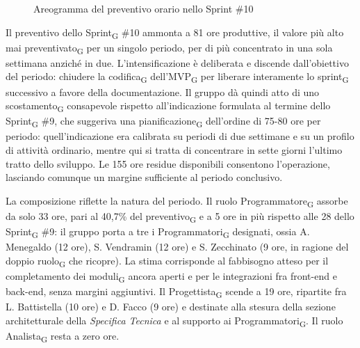 ﻿\documentclass[a4paper, 10pt, colorlinks=true, linkcolor=black, urlcolor=blue, citecolor=blue, hidelinks]{article}
\begin{document}
\begin{figure}[H]

\caption{Areogramma del preventivo orario nello Sprint \#10}
\label{fig:preventivo-sprint10}
\end{figure}

Il preventivo dello Sprint\textsubscript{G} \#10 ammonta a 81 ore produttive, il valore più alto mai preventivato\textsubscript{G} per un singolo periodo, per di più concentrato in una sola settimana anziché in due. L'intensificazione è deliberata e discende dall'obiettivo del periodo: chiudere la codifica\textsubscript{G} dell'MVP\textsubscript{G} per liberare interamente lo sprint\textsubscript{G} successivo a favore della documentazione. Il gruppo dà quindi atto di uno scostamento\textsubscript{G} consapevole rispetto all'indicazione formulata al termine dello Sprint\textsubscript{G} \#9, che suggeriva una pianificazione\textsubscript{G} dell'ordine di 75-80 ore per periodo: quell'indicazione era calibrata su periodi di due settimane e su un profilo di attività ordinario, mentre qui si tratta di concentrare in sette giorni l'ultimo tratto dello sviluppo. Le 155 ore residue disponibili consentono l'operazione, lasciando comunque un margine sufficiente al periodo conclusivo.

La composizione riflette la natura del periodo. Il ruolo Programmatore\textsubscript{G} assorbe da solo 33 ore, pari al 40,7\% del preventivo\textsubscript{G} e a 5 ore in più rispetto alle 28 dello Sprint\textsubscript{G} \#9: il gruppo porta a tre i Programmatori\textsubscript{G} designati, ossia A. Menegaldo (12 ore), S. Vendramin (12 ore) e S. Zecchinato (9 ore, in ragione del doppio ruolo\textsubscript{G} che ricopre). La stima corrisponde al fabbisogno atteso per il completamento dei moduli\textsubscript{G} ancora aperti e per le integrazioni fra front-end e back-end, senza margini aggiuntivi. Il Progettista\textsubscript{G} scende a 19 ore, ripartite fra L. Battistella (10 ore) e D. Facco (9 ore) e destinate alla stesura della sezione architetturale della \textit{Specifica Tecnica} e al supporto ai Programmatori\textsubscript{G}. Il ruolo Analista\textsubscript{G} resta a zero ore.
\end{document}
